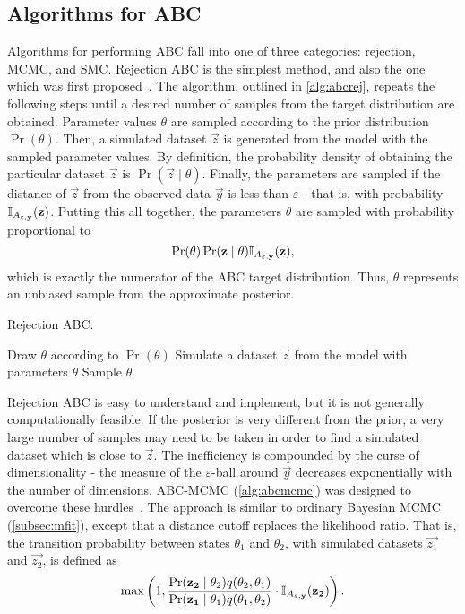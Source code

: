 \subsection{Algorithms for ABC}
\label{subsec:abcalg}

Algorithms for performing \gls{ABC} fall into one of three categories:
rejection, \gls{MCMC}, and \gls{SMC}. Rejection ABC is the simplest method, and
also the one which was first proposed~\autocite{rubin1984bayesianly,
tavare1997inferring}. The algorithm, outlined in \cref{alg:abcrej}, repeats the
following steps until a desired number of samples from the target distribution
are obtained. Parameter values $\theta$ are sampled according to the prior
distribution $\Pr(\theta)$. Then, a simulated dataset $\vec{z}$ is generated
from the model with the sampled parameter values. By definition, the
probability density of obtaining the particular dataset $\vec{z}$ is
$\Pr(\vec{z} \mid \theta)$. Finally, the parameters are sampled if the distance
of $\vec{z}$ from the observed data $\vec{y}$ is less than $\varepsilon$ - that
is, with probability $\mathbb{I}_{A_{\varepsilon, \mathbf{y}}}(\mathbf{z})$. Putting this all
together, the parameters $\theta$ are sampled with probability proportional to
\[
  \Pr(\theta) \Pr(\mathbf{z} \mid \theta) \mathbb{I}_{A_{\varepsilon, \mathbf{y}}}(\mathbf{z}),
\]
which is exactly the numerator of the \gls{ABC} target distribution. Thus,
$\theta$ represents an unbiased sample from the approximate posterior.

\begin{algorithm}
  \caption{Rejection \gls{ABC}.}
  \begin{algorithmic}
    \Loop
      \State Draw $\theta$ according to $\Pr(\theta)$
      \State Simulate a dataset $\vec{z}$ from the model with parameters $\theta$
        \State Sample $\theta$
      \EndIf
    \EndLoop
  \end{algorithmic}
  \label{alg:abcrej}
\end{algorithm}

Rejection \gls{ABC} is easy to understand and implement, but it is not
generally computationally feasible. If the posterior is very different from the
prior, a very large number of samples may need to be taken in order to find a
simulated dataset which is close to $\vec{z}$. The inefficiency is compounded
by the curse of dimensionality - the measure of the $\varepsilon$-ball around
$\vec{y}$ decreases exponentially with the number of dimensions.
\gls{ABC}-\gls{MCMC} (\cref{alg:abcmcmc}) was designed to overcome these
hurdles~\autocite{marjoram2003markov}. The approach is similar to ordinary
Bayesian \gls{MCMC} (\cref{subsec:mfit}), except that a distance cutoff
replaces the likelihood ratio. That is, the transition probability between
states $\theta_1$ and $\theta_2$, with simulated datasets $\vec{z_1}$ and
$\vec{z_2}$, is defined as
\[
  \max\left(1, \frac{\Pr(\mathbf{z_2} \mid \theta_2) q(\theta_2, \theta_1)}
                    {\Pr(\mathbf{z_1} \mid \theta_1) q(\theta_1, \theta_2)} 
    \cdot \mathbb{I}_{A_{\varepsilon, \mathbf{y}}}(\mathbf{z_2}) \right).
\]

